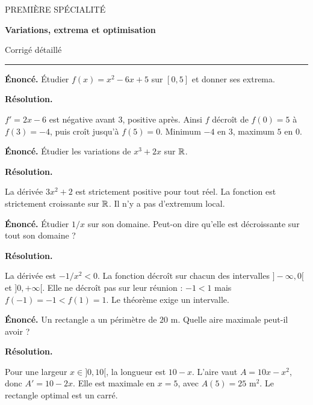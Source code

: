 \documentclass[11pt,a4paper]{article}
\begin{document}
{\small\color{Blue}PREMIÈRE SPÉCIALITÉ}\par{\LARGE\bfseries Variations, extrema et optimisation}\par{\large Corrigé détaillé}\par\vspace{0.2cm}\hrule\vspace{0.4cm}
\par\noindent\begin{minipage}{\linewidth}
{\small\color{Muted}\textbf{Énoncé.} Étudier $f(x)=x^2-6x+5$ sur $[0,5]$ et donner ses extrema.}
\par\medskip
\textbf{Résolution.}\par
$f\prime=2x-6$ est négative avant $3$, positive après. Ainsi $f$ décroît de $f(0)=5$ à $f(3)=-4$, puis croît jusqu’à $f(5)=0$. Minimum $-4$ en $3$, maximum $5$ en $0$.
\end{minipage}\par
\par\noindent\begin{minipage}{\linewidth}
{\small\color{Muted}\textbf{Énoncé.} Étudier les variations de $x^3+2x$ sur $\mathbb{R}$.}
\par\medskip
\textbf{Résolution.}\par
La dérivée $3x^2+2$ est strictement positive pour tout réel. La fonction est strictement croissante sur $\mathbb{R}$. Il n’y a pas d’extremum local.
\end{minipage}\par
\par\noindent\begin{minipage}{\linewidth}
{\small\color{Muted}\textbf{Énoncé.} Étudier $1/x$ sur son domaine. Peut-on dire qu’elle est décroissante sur tout son domaine ?}
\par\medskip
\textbf{Résolution.}\par
La dérivée est $-1/x^2<0$. La fonction décroît sur chacun des intervalles $]-\infty,0[$ et $]0,+\infty[$. Elle ne décroît pas sur leur réunion : $-1<1$ mais $f(-1)=-1<f(1)=1$. Le théorème exige un intervalle.
\end{minipage}\par
\par\noindent\begin{minipage}{\linewidth}
{\small\color{Muted}\textbf{Énoncé.} Un rectangle a un périmètre de $20$ m. Quelle aire maximale peut-il avoir ?}
\par\medskip
\textbf{Résolution.}\par
Pour une largeur $x\in]0,10[$, la longueur est $10-x$. L’aire vaut $A=10x-x^2$, donc $A\prime=10-2x$. Elle est maximale en $x=5$, avec $A(5)=25$ m$^2$. Le rectangle optimal est un carré.
\end{minipage}\par
\end{document}
